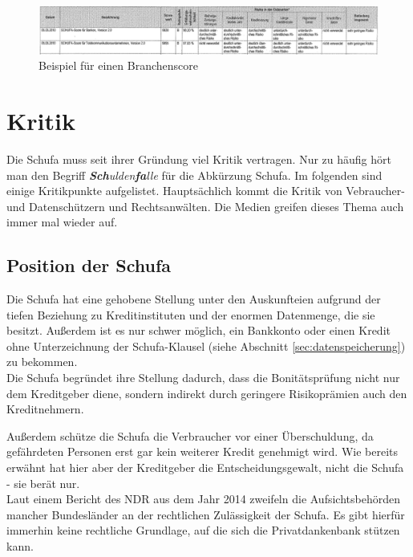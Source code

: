 \documentclass[12pt]{article}
\begin{document}
\begin{figure}[h!]
	\centering
		\includegraphics[width=\linewidth]{branchenscore}
	\caption{Beispiel für einen Branchenscore}
	\label{fig:bsp-branchenscore}
\end{figure}






\section{Kritik}

Die Schufa muss seit ihrer Gründung viel Kritik vertragen. Nur zu häufig hört man den Begriff \textit{\textbf{Sch}ulden\textbf{fa}lle} für die Abkürzung Schufa. Im folgenden sind einige Kritikpunkte aufgelistet.
Hauptsächlich kommt die Kritik von Vebraucher- und Datenschützern und Rechtsanwälten. Die Medien greifen dieses Thema auch immer mal wieder auf.

\subsection{Position der Schufa}

Die Schufa hat eine gehobene Stellung unter den Auskunfteien aufgrund der tiefen Beziehung zu Kreditinstituten und der enormen Datenmenge, die sie besitzt. Außerdem ist es nur schwer möglich,
ein Bankkonto oder einen Kredit ohne Unterzeichnung der Schufa-Klausel (siehe Abschnitt \ref{sec:datenspeicherung}) zu bekommen.\\

Die Schufa begründet ihre Stellung dadurch, dass die Bonitätsprüfung nicht nur dem Kreditgeber diene, sondern indirekt durch geringere Risikoprämien auch den Kreditnehmern.

Außerdem schütze die Schufa die Verbraucher vor einer Überschuldung, da gefährdeten Personen erst gar kein weiterer Kredit genehmigt wird. Wie bereits erwähnt hat hier aber der Kreditgeber die 
Entscheidungsgewalt, nicht die Schufa - sie berät nur.\\

Laut einem Bericht des NDR aus dem Jahr 2014 zweifeln die Aufsichtsbehörden mancher Bundesländer an der rechtlichen Zulässigkeit der Schufa. Es gibt hierfür immerhin keine rechtliche Grundlage, auf die sich
die Privatdankenbank stützen kann.
\end{document}
